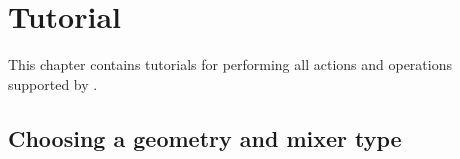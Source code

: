 \chapter{Tutorial}
This chapter contains tutorials for performing all actions and operations supported by \projectname.

%
%
%
%
%
%

\section{Choosing a geometry and mixer type}
\label{sec:ChooseGeomAndMixer}

